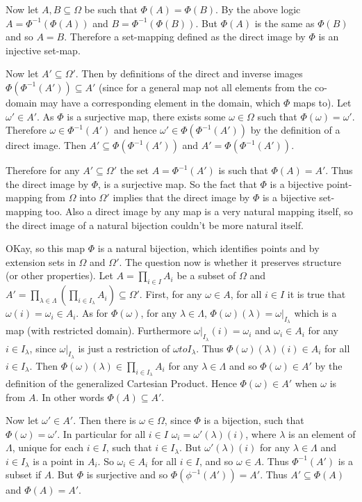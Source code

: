 \documentclass[a4paper]{article}
\begin{document}
Now let $A, B \subseteq \Omega$ be such that $\Phi(A) = \Phi(B)$. By the above logic $A = \Phi^{-1}( \Phi(A) )$ and $B = \Phi^{-1}( \Phi(B) )$. But $\Phi(A)$ is the same as $\Phi(B)$ and so $A = B$. Therefore a set-mapping defined as the direct image by $\Phi$ is an injective set-map.

Now let $A' \subseteq \Omega'$. Then by definitions of the direct and inverse images $\Phi( \Phi^{-1}(A') ) \subseteq A'$ (since for a general map not all elements from the co-domain may have a corresponding element in the domain, which $\Phi$ maps to). Let $\omega' \in A'$. As $\Phi$ is a surjective map, there exists some $\omega \in \Omega$ such that $\Phi(\omega) = \omega'$. Therefore $\omega \in \Phi^{-1}(A')$ and hence $\omega' \in \Phi( \Phi^{-1}(A') )$ by the definition of a direct image. Then $A' \subseteq \Phi( \Phi^{-1}(A') )$ and $A' = \Phi( \Phi^{-1}(A') )$.

Therefore for any $A' \subseteq \Omega'$ the set $A = \Phi^{-1}( A' )$ is such that $\Phi( A ) = A'$. Thus the direct image by $\Phi$, is a surjective map. So the fact that $\Phi$ is a bijective point-mapping from $\Omega$ into $\Omega'$  implies that the direct image by $\Phi$ is a bijective set-mapping too. Also a direct image by any map is a very natural mapping itself, so the direct image of a natural bijection couldn't be more natural itself.

OKay, so this map $\Phi$ is a natural bijection, which identifies points and by extension sets in $\Omega$ and $\Omega'$. The question now is whether it preserves structure (or other properties). Let $A = \prod_{i \in I}A_i$ be a subset of $\Omega$ and $A' = \prod_{\lambda \in \Lambda}(\prod_{i \in I_\lambda}A_i) \subseteq \Omega'$. First, for any $\omega \in A$, for all $i \in I$ it is true that $\omega(i) = \omega_i \in A_i$. As for $\Phi(\omega)$, for any $\lambda \in \Lambda$, $\Phi(\omega)(\lambda) = \omega\vert_{I_\lambda}$ which is a map (with restricted domain). Furthermore $\omega\vert_{I_\lambda}(i) = \omega_i$ and $\omega_i \in A_i$ for any $i \in I_\lambda$, since $\omega\vert_{I_\lambda}$ is just a restriction of $\omega to I_\lambda$. Thus $\Phi(\omega)(\lambda)(i) \in A_i$ for all $i \in I_\lambda$. Then $\Phi(\omega)(\lambda) \in \prod_{i \in I_\lambda}A_i$ for any $\lambda \in \Lambda$ and so $\Phi(\omega) \in A'$ by the definition of the generalized Cartesian Product. Hence $\Phi(\omega) \in A'$ when $\omega$ is from $A$. In other words $\Phi(A) \subseteq A'$.

Now let $\omega' \in A'$. Then there is $\omega \in \Omega$, since $\Phi$ is a bijection, such that $\Phi(\omega) = \omega'$. In particular for all $i \in I$ $\omega_i = \omega'(\lambda)(i)$, where $\lambda$ is an element of $\Lambda$, unique for each $i \in I$, such that $i \in I_\lambda$. But $\omega'(\lambda)(i)$ for any $\lambda \in \Lambda$ and $i \in I_\lambda$ is a point in $A_i$. So $\omega_i \in A_i$ for all $i \in I$, and so $\omega \in A$. Thus $\Phi^{-1}(A')$ is a subset if $A$. But $\Phi$ is surjective and so $\Phi( \phi^{-1}(A') ) = A'$. Thus $A' \subseteq \Phi(A)$ and $\Phi(A) = A'$.
\end{document}
